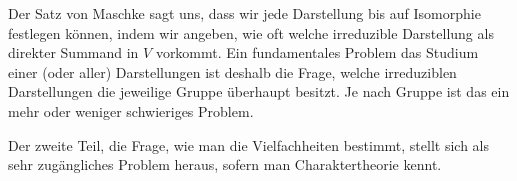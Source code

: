\begin{remark}
Der Satz von Maschke sagt uns, dass wir jede Darstellung bis auf Isomorphie festlegen können, indem wir angeben, wie oft welche irreduzible Darstellung als direkter Summand in $V$ vorkommt. Ein fundamentales Problem das Studium einer (oder aller) Darstellungen ist deshalb die Frage, welche irreduziblen Darstellungen die jeweilige Gruppe überhaupt besitzt. Je nach Gruppe ist das ein mehr oder weniger schwieriges Problem.

Der zweite Teil, die Frage, wie man die Vielfachheiten bestimmt, stellt sich als sehr zugängliches Problem heraus, sofern man Charaktertheorie kennt.
\end{remark}
